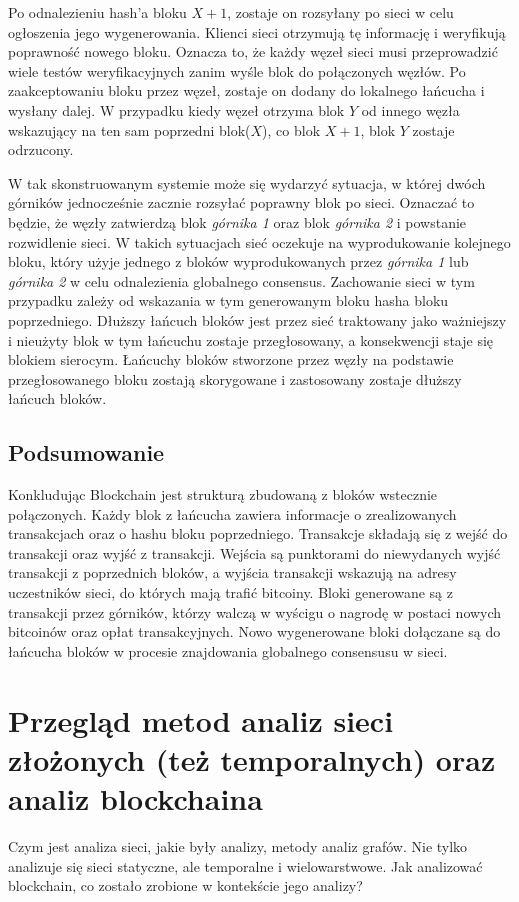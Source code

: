 \documentclass[12pt, twoside, final, openany]{mgr}
\begin{document}
\indent Po odnalezieniu hash'a bloku $X+1$, zostaje on rozsyłany po sieci w celu ogłoszenia jego wygenerowania. Klienci sieci otrzymują tę informację i weryfikują poprawność nowego bloku. Oznacza to, że każdy węzeł sieci musi przeprowadzić wiele testów weryfikacyjnych zanim wyśle blok do połączonych węzłów. Po zaakceptowaniu bloku przez węzeł, zostaje on dodany do lokalnego łańcucha i wysłany dalej. W przypadku kiedy węzeł otrzyma blok $Y$ od innego węzła wskazujący na ten sam poprzedni blok($X$), co blok $X+1$, blok $Y$ zostaje odrzucony.

\indent W tak skonstruowanym systemie może się wydarzyć sytuacja, w której dwóch górników jednocześnie zacznie rozsyłać poprawny blok po sieci. Oznaczać to będzie, że węzły zatwierdzą blok \textit{górnika 1} oraz blok \textit{górnika 2} i powstanie rozwidlenie sieci. W takich sytuacjach sieć oczekuje na wyprodukowanie kolejnego bloku, który użyje jednego z bloków wyprodukowanych przez \textit{górnika 1} lub \textit{górnika 2} w celu odnalezienia globalnego consensus. Zachowanie sieci w tym przypadku zależy od wskazania w tym generowanym bloku hasha bloku poprzedniego. Dłuższy łańcuch bloków jest przez sieć traktowany jako ważniejszy i nieużyty blok w tym łańcuchu zostaje przegłosowany, a konsekwencji staje się blokiem sierocym. Łańcuchy bloków stworzone przez węzły na podstawie przegłosowanego bloku zostają skorygowane i zastosowany zostaje dłuższy łańcuch bloków.

\section{Podsumowanie}

\indent Konkludując Blockchain jest strukturą zbudowaną z bloków wstecznie połączonych. Każdy blok z łańcucha zawiera informacje o zrealizowanych transakcjach oraz o hashu bloku poprzedniego. Transakcje składają się z wejść do transakcji oraz wyjść z transakcji. Wejścia są punktorami do niewydanych wyjść transakcji z poprzednich bloków, a wyjścia transakcji wskazują na adresy uczestników sieci, do których mają trafić bitcoiny. Bloki generowane są z transakcji przez górników, którzy walczą w wyścigu o nagrodę w postaci nowych bitcoinów oraz opłat transakcyjnych. Nowo wygenerowane bloki dołączane są do łańcucha bloków w procesie znajdowania globalnego consensusu w sieci.

\chapter{Przegląd metod analiz sieci złożonych (też temporalnych) oraz analiz blockchaina}
Czym jest analiza sieci, jakie były analizy, metody analiz grafów.
Nie tylko analizuje się sieci statyczne, ale temporalne i wielowarstwowe.
Jak analizować blockchain, co zostało zrobione w kontekście jego analizy?
\end{document}
